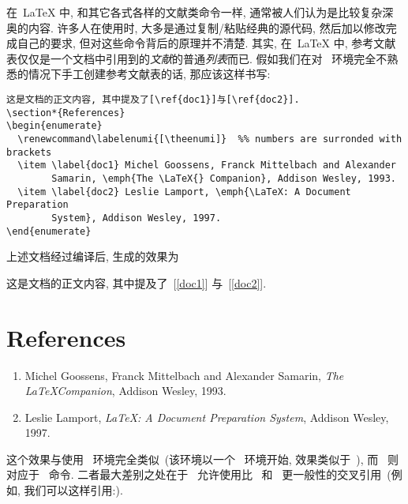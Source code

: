 \documentclass{article}
\def\mtcskip{}
\begin{document}
\label{part1}
\parttoc
\mtcskip

在~\LaTeX{} 中, \bt 和其它各式各样的文献类命令一样, 通常被人们认为是比较复杂深奥的内容. 
许多人在使用时, 大多是通过复制/粘贴经典的源代码, 然后加以修改完成自己的要求, 但对这些命令背后的原理并不清楚.
其实, 在~\LaTeX{} 中, 参考文献表仅仅是一个文档中引用到的\emph{文献}的普通\emph{列表}而已. 
假如我们在对~ 环境完全不熟悉的情况下手工创建参考文献表的话, 那应该这样书写:

\medskip
\begin{verbatim}
这是文档的正文内容, 其中提及了[\ref{doc1}]与[\ref{doc2}].
\section*{References}
\begin{enumerate}
  \renewcommand\labelenumi{[\theenumi]}  %% numbers are surronded with brackets
  \item \label{doc1} Michel Goossens, Franck Mittelbach and Alexander
        Samarin, \emph{The \LaTeX{} Companion}, Addison Wesley, 1993.
  \item \label{doc2} Leslie Lamport, \emph{\LaTeX: A Document Preparation
        System}, Addison Wesley, 1997.
\end{enumerate}
\end{verbatim}
\noindent 上述文档经过编译后, 生成的效果为
\begin{myex}
这是文档的正文内容, 其中提及了~[\ref{doc1}] 与~[\ref{doc2}].
\section*{References}
\begin{enumerate}
  \renewcommand\labelenumi{[\theenumi]}  %
  \item \label{doc1} Michel Goossens, Franck Mittelbach and Alexander
        Samarin, \emph{The \LaTeX Companion}, Addison Wesley, 1993.
  \item \label{doc2} Leslie Lamport, \emph{\LaTeX: A Document Preparation
        System}, Addison Wesley, 1997.
\end{enumerate}
\end{myex}

这个效果与使用~ 环境完全类似~(该环境以一个~ 环境开始, 效果类似于~), 
而~ 则对应于~ 命令. 二者最大差别之处在于~ 允许使用比~ 和~ 更一般性的交叉引用~(例如, 我们可以这样引用:\cite{latex:lc}).
\end{document}
